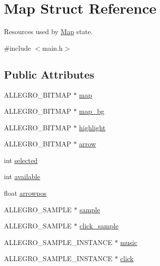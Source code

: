 \hypertarget{structMap}{\section{\-Map \-Struct \-Reference}
\label{structMap}
}


\-Resources used by \hyperlink{structMap}{\-Map} state.  




{\ttfamily \#include $<$main.\-h$>$}

\subsection*{\-Public \-Attributes}
\begin{DoxyCompactItemize}
\item 
\-A\-L\-L\-E\-G\-R\-O\-\_\-\-B\-I\-T\-M\-A\-P $\ast$ \hyperlink{structMap_abaf70186fbb2b4b047b8350e3ec5347c}{map}
\item 
\-A\-L\-L\-E\-G\-R\-O\-\_\-\-B\-I\-T\-M\-A\-P $\ast$ \hyperlink{structMap_ac0b084971832b4466a9d91233452378d}{map\-\_\-bg}
\item 
\-A\-L\-L\-E\-G\-R\-O\-\_\-\-B\-I\-T\-M\-A\-P $\ast$ \hyperlink{structMap_a703b41e358b7c8ff39bf0d8dd37bb408}{highlight}
\item 
\-A\-L\-L\-E\-G\-R\-O\-\_\-\-B\-I\-T\-M\-A\-P $\ast$ \hyperlink{structMap_a607f79d7c594540ebf58f88fb999250d}{arrow}
\item 
int \hyperlink{structMap_a07b3269191a003d517977da3adc7f0a4}{selected}
\item 
int \hyperlink{structMap_aa000e129cf19d6d6d9a78cfce0ef58fc}{available}
\item 
float \hyperlink{structMap_a4f395f7bdf7bc0782e29e996e87237bb}{arrowpos}
\item 
\-A\-L\-L\-E\-G\-R\-O\-\_\-\-S\-A\-M\-P\-L\-E $\ast$ \hyperlink{structMap_a3334bc47109df8757b77c9d3bf67ec5f}{sample}
\item 
\-A\-L\-L\-E\-G\-R\-O\-\_\-\-S\-A\-M\-P\-L\-E $\ast$ \hyperlink{structMap_abcd15a027ece6075efe4baaf99c7595d}{click\-\_\-sample}
\item 
\-A\-L\-L\-E\-G\-R\-O\-\_\-\-S\-A\-M\-P\-L\-E\-\_\-\-I\-N\-S\-T\-A\-N\-C\-E $\ast$ \hyperlink{structMap_a17ae4f61c1209816b26940d1c8a88f68}{music}
\item 
\-A\-L\-L\-E\-G\-R\-O\-\_\-\-S\-A\-M\-P\-L\-E\-\_\-\-I\-N\-S\-T\-A\-N\-C\-E $\ast$ \hyperlink{structMap_a32370a5fb75fcf7d0bebd210cb2a0985}{click}
\end{DoxyCompactItemize}


